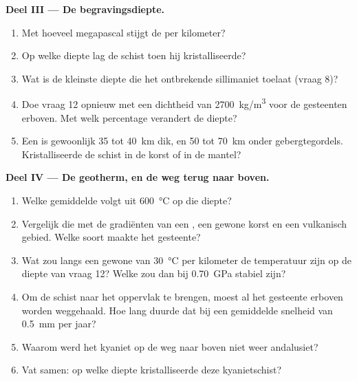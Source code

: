 \begin{problem}
\medskip
\noindent\textbf{Deel III --- De begravingsdiepte.}
\begin{enumerate}[resume]
  \item Met hoeveel megapascal stijgt de  per
        kilometer?
  \item Op welke diepte lag de schist toen hij kristalliseerde?
  \item Wat is de kleinste diepte die het ontbrekende sillimaniet toelaat
        (vraag 8)?
  \item Doe vraag 12 opnieuw met een dichtheid van \qty{2700}{kg/m^3} voor de gesteenten
        erboven. Met welk percentage verandert de diepte?
  \item Een  is gewoonlijk 35 tot \qty{40}{km} dik, en 50 tot
        \qty{70}{km} onder gebergtegordels. Kristalliseerde de schist in de
        korst of in de mantel?
\end{enumerate}

\medskip
\noindent\textbf{Deel IV --- De geotherm, en de weg terug naar boven.}
\begin{enumerate}[resume]
  \item Welke gemiddelde  volgt uit \qty{600}{\celsius} op die diepte?
  \item Vergelijk die met de gradiënten van een , een gewone
        korst en een vulkanisch gebied. Welke soort  maakte het gesteente?
  \item Wat zou langs een gewone  van \qty{30}{\celsius} per kilometer de
        temperatuur zijn op de diepte van vraag 12? Welke
         zou dan bij \qty{0.70}{GPa} stabiel zijn?
  \item Om de schist naar het oppervlak te brengen, moest al het gesteente erboven worden
        weggehaald. Hoe lang duurde dat bij een gemiddelde snelheid van \qty{0.5}{mm} per jaar?
  \item Waarom werd het kyaniet op de weg naar boven niet weer andalusiet?
  \item Vat samen: op welke diepte kristalliseerde deze kyanietschist?
\end{enumerate}
\end{problem}
